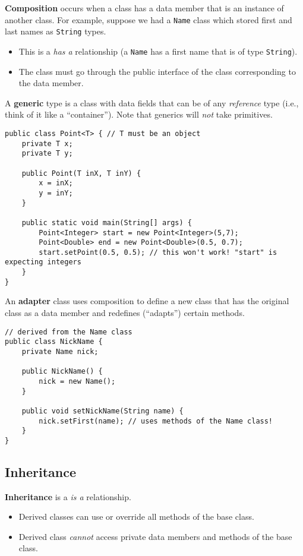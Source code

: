 \documentclass{article}
\begin{document}
\begin{flushleft}
\textbf{Composition} occurs when a class has a data member that is an instance of another class. For example, suppose we had a \texttt{Name} class which stored first and last names as \texttt{String} types. 
\begin{itemize}
    \item This is a \textit{has a} relationship (a \texttt{Name} has a first name that is of type \texttt{String}).
    \item The class must go through the public interface of the class corresponding to the data member.
\end{itemize}

A \textbf{generic} type is a class with data fields that can be of any \textit{reference} type (i.e., think of it like a ``container''). Note that generics will \textit{not} take primitives.

\begin{verbatim}
public class Point<T> { // T must be an object
    private T x;
    private T y;

    public Point(T inX, T inY) {
        x = inX;
        y = inY;
    }
    
    public static void main(String[] args) {
        Point<Integer> start = new Point<Integer>(5,7);
        Point<Double> end = new Point<Double>(0.5, 0.7);
        start.setPoint(0.5, 0.5); // this won't work! "start" is expecting integers
    }
}
\end{verbatim}

An \textbf{adapter} class uses composition to define a new class that has the original class as a data member and redefines (``adapts'') certain methods.

\begin{verbatim}
// derived from the Name class
public class NickName {
    private Name nick;
    
    public NickName() {
        nick = new Name();
    }
    
    public void setNickName(String name) {
        nick.setFirst(name); // uses methods of the Name class!
    }
}
\end{verbatim}



\subsection{Inheritance}

\textbf{Inheritance} is a \textit{is a} relationship.
\begin{itemize}
    \item Derived classes can use or override all methods of the base class.
    \item Derived class \textit{cannot} access private data members and methods of the base class.
\end{itemize}


\end{flushleft}
\end{document}
